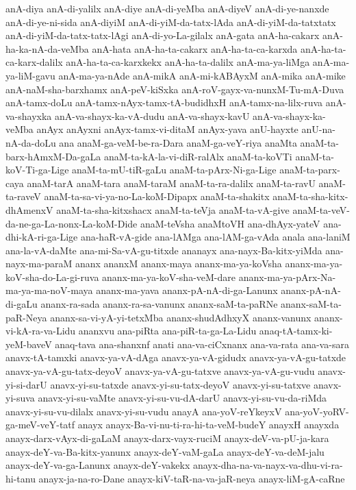 {anA-diya
anA-di-yalilx
anA-diye
anA-di-yeMba
anA-diyeV
anA-di-ye-nanxde
anA-di-ye-ni-sida
anA-diyiM
anA-di-yiM-da-tatx-lAda
anA-di-yiM-da-tatxtatx
anA-di-yiM-da-tatx-tatx-lAgi
anA-di-yo-La-gilalx
anA-gata
anA-ha-cakarx
anA-ha-ka-nA-da-veMba
anA-hata
anA-ha-ta-cakarx
anA-ha-ta-ca-karxda
anA-ha-ta-ca-karx-dalilx
anA-ha-ta-ca-karxkekx
anA-ha-ta-dalilx
anA-ma-ya-liMga
anA-ma-ya-liM-gavu
anA-ma-ya-nAde
anA-mikA
anA-mi-kABAyxM
anA-mika
anA-mike
anA-naM-sha-barxhamx
anA-peV-kiSxka
anA-roV-gayx-va-nunxM-Tu-mA-Duva
anA-tamx-doLu
anA-tamx-nAyx-tamx-tA-budidhxH
anA-tamx-na-lilx-ruva
anA-va-shayxka
anA-va-shayx-ka-vA-dudu
anA-va-shayx-kavU
anA-va-shayx-ka-veMba
anAyx
anAyxni
anAyx-tamx-vi-ditaM
anAyx-yava
anU-hayxte
anU-na-nA-da-doLu
ana
anaM-ga-veM-be-ra-Dara
anaM-ga-veY-riya
anaMta
anaM-ta-barx-hAmxM-Da-gaLa
anaM-ta-kA-la-vi-diR-ralAlx
anaM-ta-koVTi
anaM-ta-koV-Ti-ga-Lige
anaM-ta-mU-tiR-gaLu
anaM-ta-pArx-Ni-ga-Lige
anaM-ta-parx-caya
anaM-tarA
anaM-tara
anaM-taraM
anaM-ta-ra-dalilx
anaM-ta-ravU
anaM-ta-raveV
anaM-ta-sa-vi-ya-no-La-koM-Dipapx
anaM-ta-shakitx
anaM-ta-sha-kitx-dhAmenxV
anaM-ta-sha-kitxshacx
anaM-ta-teVja
anaM-ta-vA-give
anaM-ta-veV-da-ne-ga-La-nonx-La-koM-Dide
anaM-teVsha
anaMtoVH
ana-dhAyx-yateV
ana-dhi-kA-ri-ga-Lige
ana-haR-vA-gide
ana-lAMga
ana-lAM-ga-vAda
anala
ana-laniM
ana-la-vA-daMte
ana-mi-Sa-vA-gu-titxde
ananayx
ana-nayx-Ba-kitx-yiMda
ana-nayx-ma-paraM
ananx
ananxM
ananx-maya
ananx-ma-ya-koVsha
ananx-ma-ya-koV-sha-do-La-gi-ruva
ananx-ma-ya-koV-sha-veM-dare
ananx-ma-ya-pArx-Na-ma-ya-ma-noV-maya
ananx-ma-yava
ananx-pA-nA-di-ga-Lanunx
ananx-pA-nA-di-gaLu
ananx-ra-sada
ananx-ra-sa-vanunx
ananx-saM-ta-paRNe
ananx-saM-ta-paR-Neya
ananx-sa-vi-yA-yi-tetxMba
ananx-shudAdhxyX
ananx-vanunx
ananx-vi-kA-ra-va-Lidu
ananxvu
ana-piRta
ana-piR-ta-ga-La-Lidu
anaq-tA-tamx-ki-yeM-baveV
anaq-tava
ana-shanxnf
anati
ana-va-ciCxnanx
ana-va-rata
ana-va-sara
anavx-tA-tamxki
anavx-ya-vA-dAga
anavx-ya-vA-gidudx
anavx-ya-vA-gu-tatxde
anavx-ya-vA-gu-tatx-deyoV
anavx-ya-vA-gu-tatxve
anavx-ya-vA-gu-vudu
anavx-yi-si-darU
anavx-yi-su-tatxde
anavx-yi-su-tatx-deyoV
anavx-yi-su-tatxve
anavx-yi-suva
anavx-yi-su-vaMte
anavx-yi-su-vu-dA-darU
anavx-yi-su-vu-da-riMda
anavx-yi-su-vu-dilalx
anavx-yi-su-vudu
anayA
ana-yoV-reYkeyxV
ana-yoV-yoRV-ga-meV-veY-tatf
anayx
anayx-Ba-vi-nu-ti-ra-hi-ta-veM-budeY
anayxH
anayxda
anayx-darx-vAyx-di-gaLaM
anayx-darx-vayx-ruciM
anayx-deV-va-pU-ja-kara
anayx-deY-va-Ba-kitx-yanunx
anayx-deY-vaM-gaLa
anayx-deY-va-deM-jalu
anayx-deY-va-ga-Lanunx
anayx-deY-vakekx
anayx-dha-na-va-nayx-va-dhu-vi-ra-hi-tanu
anayx-ja-na-ro-Dane
anayx-kiV-taR-na-va-jaR-neya
anayx-liM-gA-caRne
}
